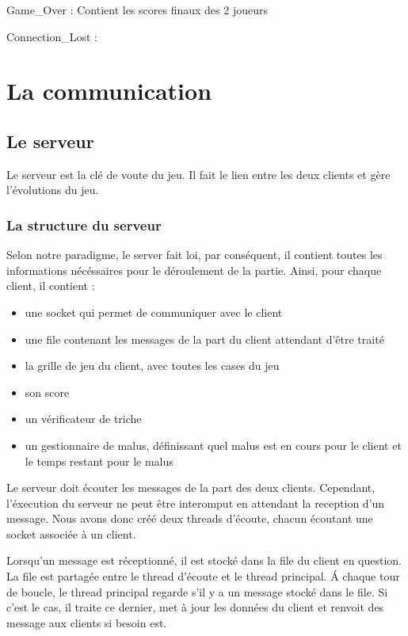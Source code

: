 \documentclass[a4paper, 12pt]{article}
\begin{document}
Game\_Over :
    Contient les scores finaux des 2 joueurs

Connection\_Lost : 
    



\section{La communication}
	\subsection{Le serveur}

		Le serveur est la clé de voute du jeu. Il fait le lien entre les deux clients et gère l'évolutions du jeu.

		\subsubsection{La structure du serveur}

		Selon notre paradigme, le server fait loi, par conséquent, il contient toutes les informations nécéssaires pour le déroulement de la partie. Ainsi, pour chaque client, il contient : 
			\begin{itemize}
				\item une socket qui permet de communiquer avec le client
				\item une file contenant les messages de la part du client attendant d'être traité
				\item la grille de jeu du client, avec toutes les cases du jeu
				\item son score
				\item un vérificateur de triche
				\item un gestionnaire de malus, définissant quel malus est en cours pour le client et le temps restant pour le malus
			\end{itemize}

		Le serveur doit écouter les messages de la part des deux clients. Cependant, l'éxecution du serveur ne peut être interomput en attendant la reception d'un message. Nous avons donc créé deux threads d'écoute, chacun écoutant une socket associée à un client. 

		Lorsqu'un message est réceptionné, il est stocké dans la file du client en question. La file est partagée entre le thread d'écoute et le thread principal. \'A chaque tour de boucle, le thread principal regarde s'il y a un message stocké dans le file. Si c'est le cas, il traite ce dernier, met à jour les données du client et renvoit des message aux clients si besoin est.
\end{document}
